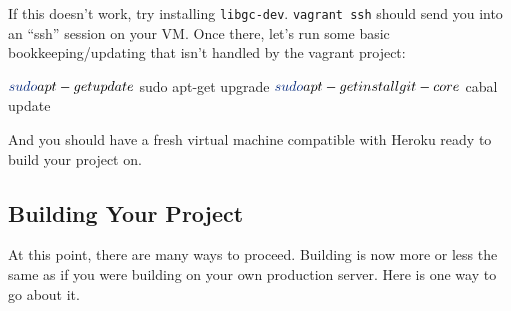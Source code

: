 \documentclass[]{article}
\newenvironment{Shaded}{}{}
\newcommand{\ExtensionTok}[1]{#1}
\newcommand{\FunctionTok}[1]{\textcolor[rgb]{0.02,0.16,0.49}{#1}}
\newcommand{\NormalTok}[1]{#1}
\begin{document}
\begin{enumerate}
\begin{Shaded}
\end{Shaded}

  If this doesn't work, try installing \texttt{libgc-dev}. \texttt{vagrant\ ssh}
  should send you into an ``ssh'' session on your VM. Once there, let's run some
  basic bookkeeping/updating that isn't handled by the vagrant project:

\begin{Shaded}
\begin{Highlighting}[]
\NormalTok{$ }\FunctionTok{sudo}\NormalTok{ apt-get update}
\NormalTok{$ }\FunctionTok{sudo}\NormalTok{ apt-get upgrade}
\NormalTok{$ }\FunctionTok{sudo}\NormalTok{ apt-get install git-core}
\NormalTok{$ }\ExtensionTok{cabal}\NormalTok{ update}
\end{Highlighting}
\end{Shaded}
\end{enumerate}

And you should have a fresh virtual machine compatible with Heroku ready to
build your project on.

\hypertarget{building-your-project}{%
\subsection{Building Your Project}\label{building-your-project}}

At this point, there are many ways to proceed. Building is now more or less the
same as if you were building on your own production server. Here is one way to
go about it.
\end{document}
